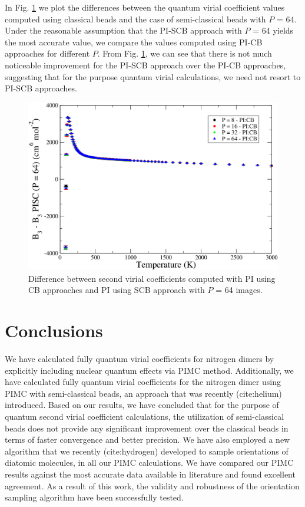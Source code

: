         In Fig. \ref{fig:B3AllDiffPICB} we plot the differences between the quantum virial coefficient values computed using classical beads and the case of semi-classical beads with $P$ = 64. Under the reasonable assumption that the PI-SCB approach with $P$ = 64 yields the most accurate value, we compare the values computed using PI-CB approaches for different $P$. From Fig. \ref{fig:B3AllDiffPICB}, we can see that there is not much noticeable improvement for the PI-SCB approach over the PI-CB approaches, suggesting that for the purpose quantum virial calculations, we need not resort to PI-SCB approaches.
        \begin{figure}[!htbp]
            \centering
            \includegraphics[scale=0.20,keepaspectratio]{Chapter-5/Figures/B3AllDiffPICB.png}
            \caption{Difference between second virial coefficients computed with PI using CB approaches and PI using SCB approach with $P$ = 64 images.}
            \label{fig:B3AllDiffPICB}
        \end{figure}
    
    \section{Conclusions}
    \label{sec:conclusion}
        We have calculated fully quantum virial coefficients for nitrogen dimers by explicitly including nuclear quantum effects via PIMC method. Additionally, we have calculated fully quantum virial coefficients for the nitrogen dimer using PIMC with semi-classical beads, an approach that was recently (cite:helium) introduced. Based on our results, we have concluded that for the purpose of quantum second virial coefficient calculations, the utilization of semi-classical beads does not provide any significant improvement over the classical beads in terms of faster convergence and better precision. We have also employed a new algorithm that we recently (cite:hydrogen) developed to sample orientations of diatomic molecules, in all our PIMC calculations. We have compared our PIMC results against the most accurate data available in literature and found excellent agreement. As a result of this work, the validity and robustness of the orientation sampling algorithm have been successfully tested.


